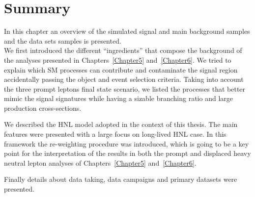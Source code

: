 \section{Summary}\label{sec:summaryC4}
In this chapter an overview of the simulated signal and main background samples and the data sets
samples is presented.\\
We first introduced the different ``ingredients'' that compose the
background of the analyses presented in Chapters~\ref{Chapter5}
and~\ref{Chapter6}. We tried to explain which SM processes can
contribute and contaminate the signal region accidentally passing the object and event selection criteria. Taking into account the three prompt
leptons final state scenario, we listed the processes that better
mimic the signal signatures while having a sizable branching
ratio and large production cross-sections. 

We described the HNL model adopted in the context of this thesis. The
main features were presented with a large focus on
long-lived HNL case. In this framework the re-weighting procedure was
introduced, which is going to be a key point for the 
interpretation of the results in both the prompt and displaced heavy neutral lepton
analyses of Chapters~\ref{Chapter5}
and~\ref{Chapter6}.

Finally details about data taking, data campaigns and primary datasets were presented.


